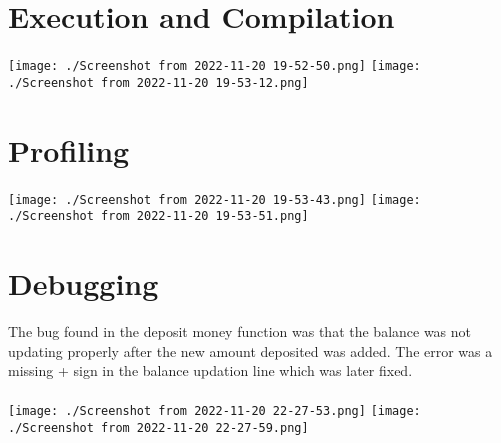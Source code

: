 \documentclass{article}
\begin{document}
\section{Execution and Compilation}

\texttt{[image: ./Screenshot from 2022-11-20 19-52-50.png]} 
\texttt{[image: ./Screenshot from 2022-11-20 19-53-12.png]} 

\section{Profiling}
\texttt{[image: ./Screenshot from 2022-11-20 19-53-43.png]} 
\texttt{[image: ./Screenshot from 2022-11-20 19-53-51.png]} 
\section{Debugging}
The bug found in the deposit money function was that the balance was not updating properly after the new amount deposited was added.
The error was a missing + sign in the balance updation line which was later fixed.\\ \\
\texttt{[image: ./Screenshot from 2022-11-20 22-27-53.png]}    
\texttt{[image: ./Screenshot from 2022-11-20 22-27-59.png]} 



   
 
\end{document}

